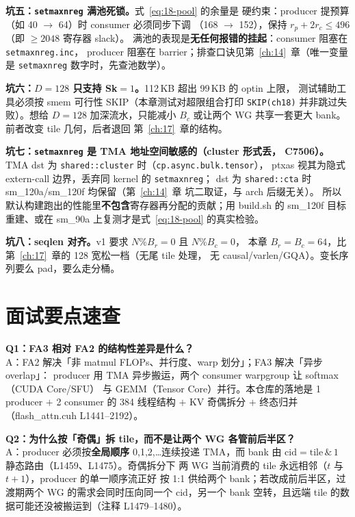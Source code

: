 \textbf{坑五：\texttt{setmaxnreg} 满池死锁。}式~\ref{eq:18-pool} 的余量是
硬约束：producer 提预算（如 40 $\to$ 64）时 consumer 必须同步下调
（168 $\to$ 152），保持 $r_p + 2r_c \le 496$（即 $\ge 2048$ 寄存器 slack）。
满池的表现是\textbf{无任何报错的挂起}：consumer 阻塞在 \texttt{setmaxnreg.\allowbreak{}inc}，
producer 阻塞在 barrier；排查口诀见第~\ref{ch:14}~章（唯一变量是
\texttt{setmaxnreg} 数字时，先查池数学）。

\textbf{坑六：$D{=}128$ 只支持 Sk$=1$。}\allowbreak{}112\,KB 超出 99\,KB 的 optin 上限，
测试辅助工具必须按 smem 可行性 SKIP（本章测试对超限组合打印
\texttt{SKIP(ch18)} 并非跳过失败）。想给 $D{=}128$ 加深流水，只能减小
$B_c$ 或让两个 WG 共享一套更大 bank。前者改变 tile 几何，后者退回
第~\ref{ch:17}~章的结构。

\textbf{坑七：\texttt{setmaxnreg} 是 TMA 地址空间敏感的（cluster 形式丢，
C7506）。}\allowbreak{}TMA dst 为 \texttt{shared::cluster} 时（\texttt{cp.\allowbreak{}async.\allowbreak{}bulk.\allowbreak{}tensor}），
ptxas 视其为隐式 extern-call 边界，丢弃同 kernel 的 \texttt{setmaxnreg}；
dst 为 \texttt{shared::cta} 时 sm\_120a/sm\_120f 均保留（第~\ref{ch:14}~章
坑二取证，与 arch 后缀无关）。
所以默认构建跑出的性能里\textbf{不包含}寄存器再分配的贡献；用 build.sh
的 sm\_120f 目标重建、或在 sm\_90a 上复测才是式~\ref{eq:18-pool} 的真实检验。

\textbf{坑八：seqlen 对齐。}\allowbreak{}v1 要求 $N \% B_r = 0$ 且 $N \% B_c = 0$，
本章 $B_r = B_c = 64$，比第~\ref{ch:17}~章的 128 宽松一档（无尾 tile 处理，
无 causal/varlen/GQA）。变长序列要么 pad，要么走分桶。

\section{面试要点速查}

\textbf{Q1：FA3 相对 FA2 的结构性差异是什么？}\\
A：FA2 解决「非 matmul FLOPs、并行度、warp 划分」；FA3 解决「异步 overlap」：
producer 用 TMA 异步搬运，两个 consumer warpgroup 让 softmax（CUDA Core/SFU）
与 GEMM（Tensor Core）并行。本仓库的落地是 1 producer $+$ 2 consumer 的
384 线程结构 $+$ KV 奇偶拆分 $+$ 终态归并（flash\_attn.cuh L1441--2192）。

\textbf{Q2：为什么按「奇偶」拆 tile，而不是让两个 WG 各管前后半区？}\\
A：producer 必须按\textbf{全局顺序} 0,1,2,\dots 连续投递 TMA，而 bank 由
$\mathrm{cid} = \mathrm{tile}\,\&\,1$ 静态路由（L1459、L1475）。奇偶拆分下
两 WG 当前消费的 tile 永远相邻（$t$ 与 $t+1$），producer 的单一顺序流正好
按 1:1 供给两个 bank；若改成前后半区，过渡期两个 WG 的需求会同时压向同一个
cid，另一个 bank 空转，且远端 tile 的数据可能还没被搬运到（注释 L1479--1480）。


